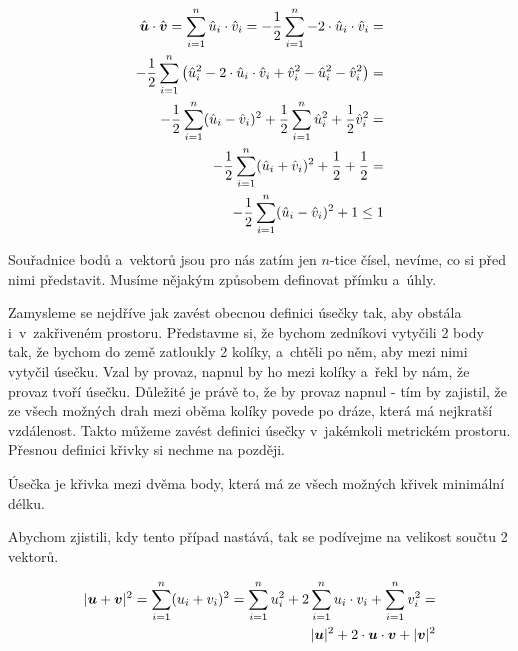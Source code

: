 \begin{equation}
\label{eq:skalarni_soucin_2}
\begin{split}
\hat{\boldsymbol{u}} \cdot \hat{\boldsymbol{v}} = \sum_{i=1}^{n} \hat{u}_i \cdot \hat{v}_i = -\frac{1}{2} \sum_{i=1}^{n} -2 \cdot \hat{u}_i \cdot \hat{v}_i = \\
-\frac{1}{2} \sum_{i=1}^{n} \left(\hat{u}_i^2 - 2 \cdot \hat{u}_i \cdot \hat{v}_i + \hat{v}_i^2 - \hat{u}_i^2 - \hat{v}_i^2 \right) = \\
-\frac{1}{2} \sum_{i=1}^{n} (\hat{u}_i - \hat{v}_i)^2 + \frac{1}{2} \sum_{i=1}^{n} \hat{u}_i^2 + \frac{1}{2} \hat{v}_i^2 = \\
-\frac{1}{2} \sum_{i=1}^{n} (\hat{u}_i + \hat{v}_i)^2 + \frac{1}{2} + \frac{1}{2} =  \\
-\frac{1}{2} \sum_{i=1}^{n} (\hat{u}_i - \hat{v}_i)^2 + 1 \leq 1
\end{split}
\end{equation}

Souřadnice bodů a~vektorů jsou pro nás zatím jen \(n\)-tice čísel, nevíme, co si před nimi představit. Musíme nějakým způsobem definovat přímku a~úhly.

Zamysleme se nejdříve jak zavést obecnou definici úsečky tak, aby obstála i~v~zakřiveném prostoru. Představme si, že bychom zedníkovi vytyčili 2 body tak, že bychom do země zatloukly 2 kolíky, a~chtěli po něm, aby mezi nimi vytyčil
úsečku. Vzal by provaz, napnul by ho mezi kolíky a~řekl by nám, že provaz tvoří úsečku. Důležité je právě to, že by provaz napnul - tím by zajistil, že ze všech možných drah mezi oběma kolíky povede po dráze, která má
nejkratší vzdálenost. Takto můžeme zavést definici úsečky v~jakémkoli metrickém prostoru. Přesnou definici křivky si nechme na později.

\begin{fact}
Úsečka je křivka mezi dvěma body, která má ze všech možných křivek minimální délku.
\end{fact}

Abychom zjistili, kdy tento případ nastává, tak se podívejme na velikost součtu 2 vektorů.

\begin{equation}
\label{eq:delka_souctu_vektoru}
\begin{split}
|\boldsymbol{u} + \boldsymbol{v}|^2 = \sum_{i=1}^{n} (u_i + v_i)^2 = \sum_{i=1}^{n} u_i^2 + 2 \sum_{i=1}^{n} u_i \cdot v_i + \sum_{i=1}^{n} v_i^2 = \\
|\boldsymbol{u}|^2 + 2 \cdot \boldsymbol{u} \cdot \boldsymbol{v} + |\boldsymbol{v}|^2
\end{split}
\end{equation}

